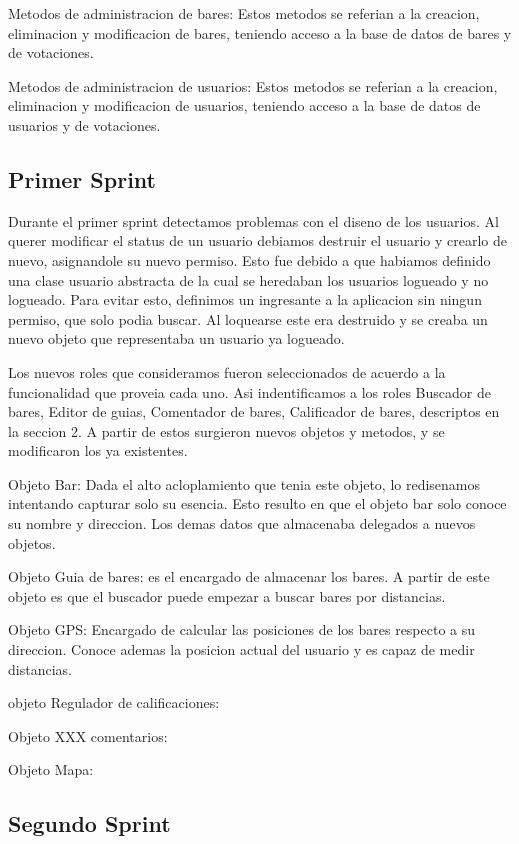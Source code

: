 \documentclass[10pt,a4paper]{article}
\begin{document}
Metodos de administracion de bares: Estos metodos se referian a la creacion, eliminacion y modificacion de bares, teniendo acceso a la base de datos de bares y de votaciones.


Metodos de administracion de usuarios: Estos metodos se referian a la creacion, eliminacion y modificacion de usuarios, teniendo acceso a la base de datos de usuarios y de votaciones.


\subsection{Primer Sprint}

Durante el primer sprint detectamos problemas con el diseno de los usuarios. Al querer modificar el status de un usuario debiamos destruir el usuario y crearlo de nuevo, asignandole su nuevo
permiso. Esto fue debido a que habiamos definido una clase usuario abstracta de la cual se heredaban los usuarios logueado y no logueado. Para evitar esto, definimos un ingresante a la aplicacion sin ningun permiso, que solo podia buscar. Al loquearse este era destruido y se creaba
un nuevo objeto que representaba un usuario ya logueado.

Los nuevos roles que consideramos fueron seleccionados de acuerdo a la funcionalidad que proveia cada uno. Asi indentificamos a los roles Buscador de bares, Editor de guias, Comentador
de bares, Calificador de bares, descriptos en la seccion 2. A partir de estos surgieron nuevos objetos y metodos, y se modificaron los ya existentes.

Objeto Bar: Dada el alto acloplamiento que tenia este objeto, lo redisenamos intentando capturar solo su esencia. Esto resulto en que el objeto bar solo conoce su nombre y direccion. 
Los demas datos que almacenaba delegados a nuevos objetos.

Objeto Guia de bares: es el encargado de almacenar los bares. A partir de este objeto es que el buscador puede empezar a buscar bares por distancias.

Objeto GPS: Encargado de calcular las posiciones de los bares respecto a su direccion. Conoce ademas la posicion actual del usuario y es capaz de medir distancias.

objeto Regulador de calificaciones:

Objeto XXX comentarios:

Objeto Mapa:

\subsection{Segundo Sprint}
\end{document}
